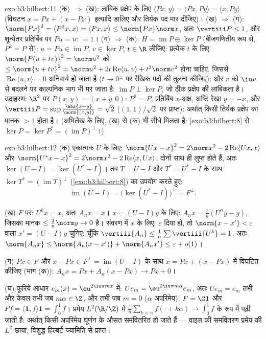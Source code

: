 \begin{solution}{exo:b3:hilbert:11}
(क) $\Rightarrow$ (ख): लांबिक प्रक्षेप के लिए $\langle Px, y\rangle = \langle Px, Py\rangle = \langle x,
Py\rangle$ (विघटन $x = Px + (x - Px)$ इत्यादि
डालिए और तिर्यक पद मार दीजिए)। (ख) $\Rightarrow$ (ग): $\norm{Px}^2 = \langle P^2x, x\rangle = \langle Px, x\rangle
\leq \norm{Px}\norm x$, अतः $\vertiii P \leq 1$, और
शून्येतर प्रतिबिंब पर $Pu = u$: $= 1$। (ग) $\Rightarrow$ (क): $H =
\operatorname{im}P \oplus \ker P$ (बीजगणितीय
रूप से, $P^2
= P$ से); $u = Pu \in \operatorname{im}P$, $v \in \ker P$, $t \in \R$ लीजिए: प्रत्येक $t$ के लिए
$\norm{P(u + tv)}^2 = \norm u^2$ को $\leq
\norm{u + tv}^2 = \norm u^2 + 2t\operatorname{Re}\langle u,
v\rangle + t^2\norm v^2$ होना चाहिए, जिससे $\operatorname{Re}\langle u, v\rangle = 0$ अनिवार्य हो जाता है ($t \to 0^\pm$
पर रैखिक पदों की तुलना कीजिए); और $v$ को $\iu v$ से बदलने पर काल्पनिक
भाग भी मर जाता है: $\operatorname{im}P \perp
\ker P$, जो ठीक प्रक्षेप की लांबिकता है। उदाहरण:
$\R^2$ पर $P(x, y) = (x + y, 0)$: $P^2 = P$, प्रतिबिंब $x$-अक्ष, अष्टि रेखा $y = -x$, और
$\vertiii P = \sup\frac{\abs{x+y}}{\norm{(x,y)}} = \sqrt2$
($(1,1)/\sqrt2$ पर प्राप्त): अर्थात् किसी तिर्यक प्रक्षेप का मानक $> 1$ होता
है। (अभिलेख के लिए, (ख) से (क) भी सीधे मिलता है: \cref{exo:b3:hilbert:8} से $\ker P = \ker P^* = (\operatorname{im}P)^\perp$।)
\end{solution}

\begin{solution}{exo:b3:hilbert:12}
(क) एकात्मक $U$ के लिए: $\norm{Ux - x}^2 = 2\norm x^2 -
2\operatorname{Re}\langle Ux, x\rangle$ और $\norm{U^*x -
x}^2 = 2\norm x^2 - 2\operatorname{Re}\langle x, Ux\rangle$: दोनों साथ ही लुप्त होते
हैं, अतः $\ker(U - I) = \ker(U^* - I)$। तब $T = U - I$ और $T^* = U^* -
I$ के साथ $\ker T^* = (\operatorname{im}T)^\perp$ (\cref{exo:b3:hilbert:8}) का उपयोग
करते हुए:
\[
\overline{\operatorname{im}(U - I)} = \bigl(\ker(U^* -
I)\bigr)^\perp = F^\perp .
\]

(ख) $F$ पर: $U^kx = x$, अतः $A_nx = x$। $x = (U - I)y$ के लिए: $A_nx = \frac1n(U^ny - y)$, जिसका मानक
$\leq \frac2n\norm y \to
0$ है। संवरण में $x$ के लिए: $\varepsilon$ दिया हो, तो $\norm{x - x'} < \varepsilon$ वाला $x' =
(U - I)y$
चुनिए; चूँकि $\vertiii{A_n} \leq \frac1n\sum\vertiii{U^k} = 1$, अतः $\norm{A_nx} \leq \norm{A_n(x - x')} + \norm{A_nx'} \leq
\varepsilon + o(1)$।

(ग) $Px \in F$ और $x -
Px \in F^\perp = \overline{\operatorname{im}(U - I)}$ के साथ $x = Px + (x - Px)$ में विघटित कीजिए (भाग (क)): $A_nx = Px + A_n(x - Px) \to Px + 0$।

(घ) फूरिये आधार $e_m(x) = \eu^{2\iu\pi mx}$ में: $Ue_m
= \eu^{2\iu\pi m\alpha}e_m$, अतः $Ue_m = e_m$ तभी और केवल तभी जब $m\alpha
\in \Z$,
और तभी जब $m = 0$ ($\alpha$ अपरिमेय): $F = \C\mathbf 1$ और $Pf = \langle\mathbf 1, f\rangle\mathbf 1 = \int_0^1f$। प्रमेय $L^2(\R/\Z)$ में
$\frac1n\sum_{k<n}f(\cdot + k\alpha) \to
\int_0^1f$ के रूप में पढ़ी जाती है: अर्थात् किसी अपरिमेय घूर्णन के 
औसत समवितरित हो जाते हैं --- वाइल की समवितरण प्रमेय की $L^2$ छाया,
विशुद्ध हिल्बर्ट ज्यामिति से प्राप्त।
\end{solution}

